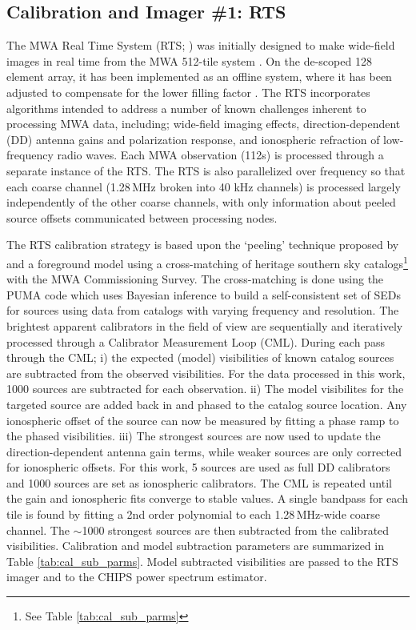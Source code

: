 \documentclass[twolcolumn,iop]{emulateapj}
\begin{document}
\subsection{Calibration and Imager \#1: RTS}
\label{sec:RTS}

The MWA Real Time System (RTS; \cite{Mitchell:2008p707,Ord:2010p8442}) was initially designed to make wide-field images in real time from the MWA 512-tile system \citep{Mitchell:2008p707}.  On the de-scoped 128 element array, it has been implemented as an offline system, where it has been adjusted to compensate for the lower filling factor \citep{Ord:2010p8442}.  The RTS incorporates algorithms intended to address a number of known challenges inherent to processing MWA data, including; wide-field imaging effects, direction-dependent (DD) antenna gains and polarization response, and ionospheric refraction of low-frequency radio waves. Each MWA observation (112s) is processed through a separate instance of the RTS. The RTS is also parallelized over frequency so that each coarse channel (1.28\,MHz broken into 40 kHz channels) is processed largely independently of the other coarse channels, with only information about peeled source offsets communicated between processing nodes.   

The RTS calibration strategy is based upon the `peeling' technique proposed by \cite{Noordam:2004p2379} and a foreground model using a cross-matching of heritage southern sky catalogs\footnote{See Table \ref{tab:cal_sub_parms}} with the MWA Commissioning Survey.  The cross-matching is done using the PUMA code which uses Bayesian inference to build a self-consistent set of SEDs for sources using data from catalogs with varying frequency and resolution. The brightest apparent calibrators in the field of view are sequentially and iteratively processed through a Calibrator Measurement Loop (CML). During each pass through the CML; i) the expected (model) visibilities of known catalog sources are subtracted from the observed visibilities. For the data processed in this work, 1000 sources are subtracted for each observation. ii) The model visibilites for the targeted source are added back in and phased to the catalog source location. Any ionospheric offset of the source can now be measured by fitting a phase ramp to the phased visibilities. iii) The strongest sources are now used to update the direction-dependent antenna gain terms, while weaker sources are only corrected for ionospheric offsets. For this work, 5 sources are used as full DD calibrators and 1000 sources are set as ionospheric calibrators. The CML is repeated until the gain and ionospheric fits converge to stable values. A single bandpass for each tile is found by fitting a 2nd order polynomial to each 1.28\,MHz-wide coarse channel. The $\sim$1000 strongest sources are then subtracted from the calibrated visibilities.   Calibration and model subtraction parameters are summarized in Table \ref{tab:cal_sub_parms}.  Model subtracted visibilities are passed to the RTS imager and to the CHIPS power spectrum estimator. %
\end{document}

